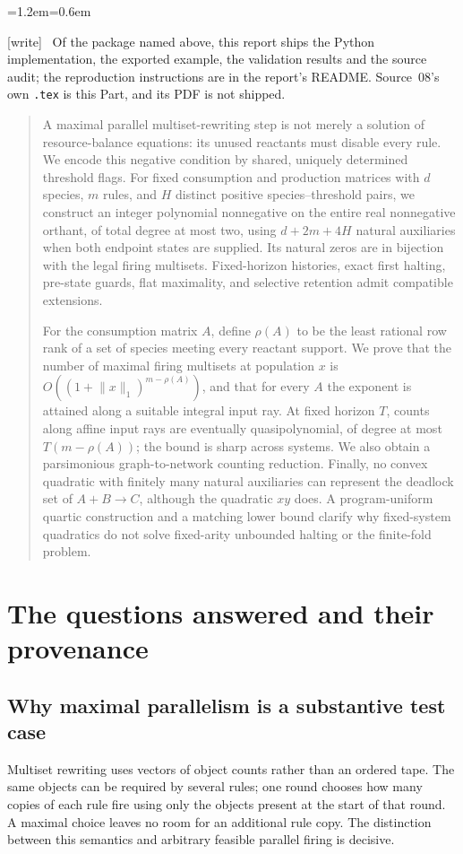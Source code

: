 \documentclass[11pt,letterpaper]{article}
\theoremstyle{definition}
\theoremstyle{remark}
\newcommand{\wtag}{\textup{[write]}}
\newenvironment{writenote}{\par\smallskip\begin{list}{}{\leftmargin=1.2em\rightmargin=0.6em}\item[]\small\wtag\ }{\end{list}\smallskip}
\begin{document}
\begin{writenote}
Of the package named above, this report ships the Python implementation, the exported example, the validation results and the source audit; the reproduction instructions are in the report's README. Source~08's own \texttt{.tex} is this Part, and its PDF is not shipped.
\end{writenote}

\begin{abstract}
A maximal parallel multiset-rewriting step is not merely a solution of
resource-balance equations: its unused reactants must disable every rule.
We encode this negative condition by shared, uniquely determined threshold
flags. For fixed consumption and production matrices with $d$ species,
$m$ rules, and $H$ distinct positive species--threshold pairs, we construct
an integer polynomial nonnegative on the entire real nonnegative orthant,
of total degree at most two, using $d+2m+4H$ natural auxiliaries when both
endpoint states are supplied. Its natural zeros are in bijection with the
legal firing multisets. Fixed-horizon histories, exact first halting,
pre-state guards, flat maximality, and selective retention admit compatible
extensions.

For the consumption matrix $A$, define $\rho(A)$ to be the least rational
row rank of a set of species meeting every reactant support. We prove that
the number of maximal firing multisets at population $x$ is
$O((1+\lVert x\rVert_1)^{m-\rho(A)})$, and that for every $A$ the exponent
is attained along a suitable integral input ray. At fixed horizon $T$,
counts along affine input rays are eventually quasipolynomial, of degree at
most $T(m-\rho(A))$; the bound is sharp across systems. We also obtain a
parsimonious graph-to-network counting reduction. Finally, no convex
quadratic with finitely many natural auxiliaries can represent the deadlock
set of $A+B\to C$, although the quadratic $xy$ does. A program-uniform
quartic construction and a matching lower bound clarify why fixed-system
quadratics do not solve fixed-arity unbounded halting or the finite-fold
problem.
\end{abstract}
\section{The questions answered and their provenance}\label{qoc:mp:sec:intro}
\subsection{Why maximal parallelism is a substantive test case}
Multiset rewriting uses vectors of object counts rather than an ordered
tape. The same objects can be required by several rules; one round chooses
how many copies of each rule fire using only the objects present at the
start of that round. A maximal choice leaves no room for an additional
rule copy. The distinction between this semantics and arbitrary feasible
parallel firing is decisive.
\end{document}
